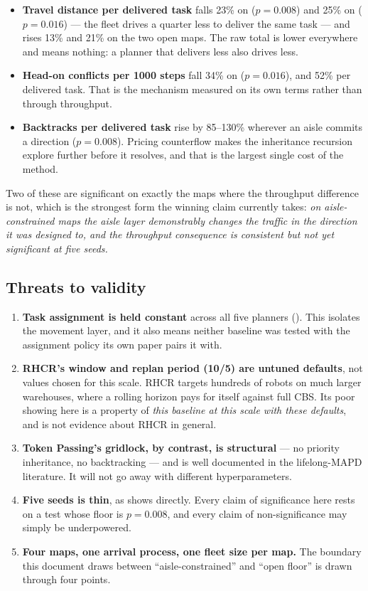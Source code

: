 \begin{itemize}
\item \textbf{Travel distance per delivered task} falls 23\% on
   ($p = 0.008$) and 25\% on
   ($p = 0.016$) --- the fleet drives a quarter
  less to deliver the same task --- and rises 13\% and 21\% on the two open
  maps. The raw total is lower everywhere and means nothing: a planner that
  delivers less also drives less.
\item \textbf{Head-on conflicts per 1000 steps} fall 34\% on
   ($p = 0.016$), and 52\% per delivered task.
  That is the mechanism measured on its own terms rather than through
  throughput.
\item \textbf{Backtracks per delivered task} rise by 85--130\% wherever an
  aisle commits a direction ($p = 0.008$). Pricing counterflow makes the
  inheritance recursion explore further before it resolves, and that is the
  largest single cost of the method.
\end{itemize}

Two of these are significant on exactly the maps where the throughput
difference is not, which is the strongest form the winning claim currently
takes: \emph{on aisle-constrained maps the aisle layer demonstrably changes the
traffic in the direction it was designed to, and the throughput consequence is
consistent but not yet significant at five seeds.}

\subsection{Threats to validity}
\label{sec:results-caveats}

\begin{enumerate}
\item \textbf{Task assignment is held constant} across all five planners
  (). This isolates the movement layer, and it also means
  neither baseline was tested with the assignment policy its own paper pairs it
  with.
\item \textbf{RHCR's window and replan period (10/5) are untuned defaults}, not
  values chosen for this scale. RHCR targets hundreds of robots on much larger
  warehouses, where a rolling horizon pays for itself against full CBS. Its poor
  showing here is a property of \emph{this baseline at this scale with these
  defaults}, and is not evidence about RHCR in general.
\item \textbf{Token Passing's gridlock, by contrast, is structural} --- no
  priority inheritance, no backtracking --- and is well documented in the
  lifelong-MAPD literature. It will not go away with different hyperparameters.
\item \textbf{Five seeds is thin}, as  shows directly. Every
  claim of significance here rests on a test whose floor is $p = 0.008$, and
  every claim of non-significance may simply be underpowered.
\item \textbf{Four maps, one arrival process, one fleet size per map.} The
  boundary this document draws between ``aisle-constrained'' and ``open floor''
  is drawn through four points.
\end{enumerate}
